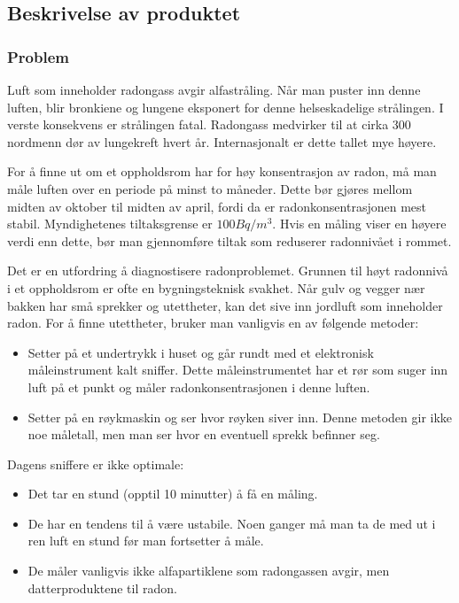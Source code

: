 \subsection{Beskrivelse av produktet}

\subsubsection{Problem}

Luft som inneholder radongass avgir alfastråling. Når man puster inn denne luften, blir bronkiene og lungene eksponert for denne helseskadelige strålingen. I verste konsekvens er strålingen fatal. Radongass medvirker til at cirka 300 nordmenn dør av lungekreft hvert år. Internasjonalt er dette tallet mye høyere.

For å finne ut om et oppholdsrom har for høy konsentrasjon av radon, må man måle luften over en periode på minst to måneder. Dette bør gjøres mellom midten av oktober til midten av april, fordi da er radonkonsentrasjonen mest stabil. Myndighetenes tiltaksgrense er $100 Bq/m^3$. Hvis en måling viser en høyere verdi enn dette, bør man gjennomføre tiltak som reduserer radonnivået i rommet.

Det er en utfordring å diagnostisere radonproblemet. Grunnen til høyt radonnivå i et oppholdsrom er ofte en bygningsteknisk svakhet. Når gulv og vegger nær bakken har små sprekker og utettheter, kan det sive inn jordluft som inneholder radon. For å finne utettheter, bruker man vanligvis en av følgende metoder:
\begin{itemize}
	\item Setter på et undertrykk i huset og går rundt med et elektronisk måleinstrument kalt sniffer. Dette måleinstrumentet har et rør som suger inn luft på et punkt og måler radonkonsentrasjonen i denne luften.
	\item Setter på en røykmaskin og ser hvor røyken siver inn. Denne metoden gir ikke noe måletall, men man ser hvor en eventuell sprekk befinner seg.
\end{itemize}

Dagens sniffere er ikke optimale:
\begin{itemize}
	\item Det tar en stund (opptil 10 minutter) å få en måling.
	\item De har en tendens til å være ustabile. Noen ganger må man ta de med ut i ren luft en stund før man fortsetter å måle.
	\item De måler vanligvis ikke alfapartiklene som radongassen avgir, men datterproduktene til radon.
\end{itemize}

